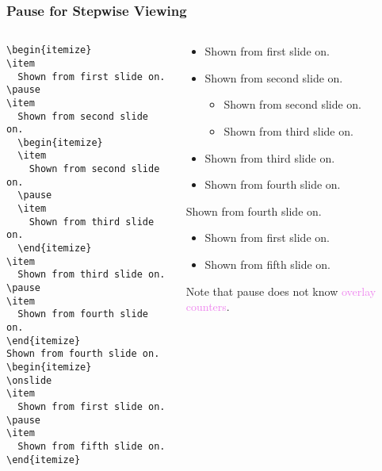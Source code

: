 \begin{frame}[fragile]
\frametitle{Pause for Stepwise Viewing}

  \begin{columns}
    \begin{column}[T]{2in} %
      \begin{tiny}
        \begin{verbatim}
\begin{itemize}
\item
  Shown from first slide on.
\pause
\item
  Shown from second slide on.
  \begin{itemize}
  \item
    Shown from second slide on.
  \pause
  \item
    Shown from third slide on.
  \end{itemize}
\item
  Shown from third slide on.
\pause
\item
  Shown from fourth slide on.
\end{itemize}
Shown from fourth slide on.
\begin{itemize}
\onslide
\item
  Shown from first slide on.
\pause
\item
  Shown from fifth slide on.
\end{itemize}
        \end{verbatim}
      \end{tiny}
    \end{column} %

    \begin{column}[T]{2.2in} %
      \begin{itemize}
        \item
          Shown from first slide on.
        \pause
        \item
          Shown from second slide on.
          \begin{itemize}
            \item
              Shown from second slide on.
            \pause
            \item
              Shown from third slide on.
          \end{itemize}
        \item
          Shown from third slide on.
        \pause
        \item
          Shown from fourth slide on.
      \end{itemize}

      Shown from fourth slide on.

      \begin{itemize}
        \onslide
        \item
          Shown from first slide on.
        \pause
        \item
          Shown from fifth slide on.
      \end{itemize}
        \pause
        Note that pause does not know \textcolor{Violet}{overlay counters}.
    \end{column} %
  \end{columns}
\end{frame}
